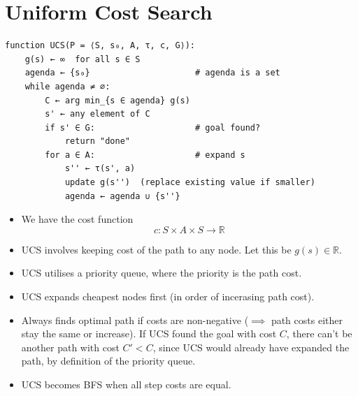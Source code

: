 \documentclass[12pt, a4paper]{article}
\begin{document}
\section{Uniform Cost Search}
\begin{algorithm}[H]

\end{algorithm}
\begin{Verbatim}
function UCS(P = ⟨S, s₀, A, τ, c, G⟩):
    g(s) ← ∞  for all s ∈ S
    agenda ← {s₀}                     # agenda is a set
    while agenda ≠ ∅:
        C ← arg min_{s ∈ agenda} g(s)
        s' ← any element of C
        if s' ∈ G:                    # goal found?
            return "done"
        for a ∈ A:                    # expand s
            s'' ← τ(s', a)
            update g(s'')  (replace existing value if smaller)
            agenda ← agenda ∪ {s''}
\end{Verbatim}

\begin{itemize}
    \item We have the cost function
    \[c: S \times A \times S \rightarrow \mathbb{R}\]
    \item UCS involves keeping cost of the path to any node. Let this be $g(s) \in \mathbb{R}$.
    \item UCS utilises a priority queue, where the priority is the path cost.
    \item UCS expands cheapest nodes first (in order of incerasing path cost).
    \item Always finds optimal path if costs are non-negative ($\implies$ path costs either stay the same or increase). 
    If UCS found the goal with cost $C$,
    there can't be another path with cost $C' < C$, since UCS would already have expanded the path,
    by definition of the priority queue.
    \item UCS becomes BFS when all step costs are equal.
\end{itemize}
\end{document}

